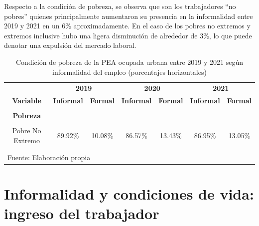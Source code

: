 \documentclass[
  letterpaper,
  12pt,
  oneside,
  spanish,
  doublespacing,
  headsepline,
  parskip]{MastersDoctoralThesis}
\begin{document}
Respecto a la condición de pobreza, se observa que son los trabajadores
``no pobres'' quienes principalmente aumentaron su presencia en la
informalidad entre 2019 y 2021 en un 6\% aproximadamente. En el caso de
los pobres no extremos y extremos inclusive hubo una ligera disminución
de alrededor de 3\%, lo que puede denotar una expulsión del mercado
laboral.

\hypertarget{tbl-pobr}{}
\begin{table}[H]
\caption{\label{tbl-pobr}Condición de pobreza de la PEA ocupada urbana entre 2019 y 2021 según
informalidad del empleo (porcentajes horizontales) }\tabularnewline

\centering\begingroup\fontsize{10}{12}\selectfont

\begin{tabular}{ccccccc}
\toprule
\multicolumn{1}{c}{ } & \multicolumn{2}{c}{\textbf{2019}} & \multicolumn{2}{c}{\textbf{2020}} & \multicolumn{2}{c}{\textbf{2021}} \\
\cmidrule(l{3pt}r{3pt}){2-3} \cmidrule(l{3pt}r{3pt}){4-5} \cmidrule(l{3pt}r{3pt}){6-7}
\textbf{Variable} & \textbf{Informal} & \textbf{Formal} & \textbf{Informal} & \textbf{Formal} & \textbf{Informal} & \textbf{Formal}\\
\midrule
\cellcolor{gray!6}{\textbf{Nacional}} & \cellcolor{gray!6}{66.40\%} & \cellcolor{gray!6}{33.60\%} & \cellcolor{gray!6}{68.42\%} & \cellcolor{gray!6}{31.58\%} & \cellcolor{gray!6}{71.41\%} & \cellcolor{gray!6}{28.59\%}\\
\textbf{Pobreza} &  &  &  &  &  & \\
\cellcolor{gray!6}{Pobre Extremo} & \cellcolor{gray!6}{98.97\%} & \cellcolor{gray!6}{1.03\%} & \cellcolor{gray!6}{94.30\%} & \cellcolor{gray!6}{5.70\%} & \cellcolor{gray!6}{94.16\%} & \cellcolor{gray!6}{5.84\%}\\
Pobre No Extremo & 89.92\% & 10.08\% & 86.57\% & 13.43\% & 86.95\% & 13.05\%\\
\cellcolor{gray!6}{No Pobre} & \cellcolor{gray!6}{63.81\%} & \cellcolor{gray!6}{36.19\%} & \cellcolor{gray!6}{64.26\%} & \cellcolor{gray!6}{35.74\%} & \cellcolor{gray!6}{68.46\%} & \cellcolor{gray!6}{31.54\%}\\
\bottomrule
\multicolumn{7}{l}{\textsuperscript{} Fuente: Elaboración propia}\\
\end{tabular}
\endgroup{}
\end{table}

\hypertarget{informalidad-y-condiciones-de-vida-ingreso-del-trabajador}{%
\section{Informalidad y condiciones de vida: ingreso del
trabajador}\label{informalidad-y-condiciones-de-vida-ingreso-del-trabajador}}
\end{document}
